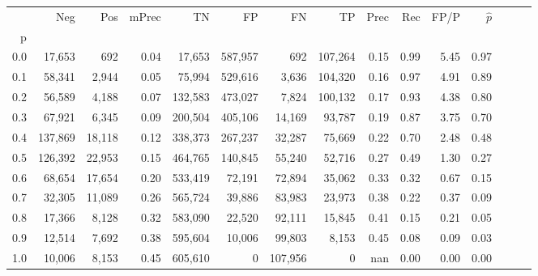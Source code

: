 \begin{tabular}{rrrrrrrrrrrrrrr}
\toprule
{} &      Neg &     Pos & mPrec &       TN &       FP &       FN &       TP &  Prec &   Rec &  FP/P & $\hat{p}$ \\
p   &          &         &       &          &          &          &          &       &       &       &           \\
\midrule
0.0 &   17,653 &     692 &  0.04 &   17,653 &  587,957 &      692 &  107,264 &  0.15 &  0.99 &  5.45 &      0.97 \\
0.1 &   58,341 &   2,944 &  0.05 &   75,994 &  529,616 &    3,636 &  104,320 &  0.16 &  0.97 &  4.91 &      0.89 \\
0.2 &   56,589 &   4,188 &  0.07 &  132,583 &  473,027 &    7,824 &  100,132 &  0.17 &  0.93 &  4.38 &      0.80 \\
0.3 &   67,921 &   6,345 &  0.09 &  200,504 &  405,106 &   14,169 &   93,787 &  0.19 &  0.87 &  3.75 &      0.70 \\
0.4 &  137,869 &  18,118 &  0.12 &  338,373 &  267,237 &   32,287 &   75,669 &  0.22 &  0.70 &  2.48 &      0.48 \\
0.5 &  126,392 &  22,953 &  0.15 &  464,765 &  140,845 &   55,240 &   52,716 &  0.27 &  0.49 &  1.30 &      0.27 \\
0.6 &   68,654 &  17,654 &  0.20 &  533,419 &   72,191 &   72,894 &   35,062 &  0.33 &  0.32 &  0.67 &      0.15 \\
0.7 &   32,305 &  11,089 &  0.26 &  565,724 &   39,886 &   83,983 &   23,973 &  0.38 &  0.22 &  0.37 &      0.09 \\
0.8 &   17,366 &   8,128 &  0.32 &  583,090 &   22,520 &   92,111 &   15,845 &  0.41 &  0.15 &  0.21 &      0.05 \\
0.9 &   12,514 &   7,692 &  0.38 &  595,604 &   10,006 &   99,803 &    8,153 &  0.45 &  0.08 &  0.09 &      0.03 \\
1.0 &   10,006 &   8,153 &  0.45 &  605,610 &        0 &  107,956 &        0 &   nan &  0.00 &  0.00 &      0.00 \\
\bottomrule
\end{tabular}
